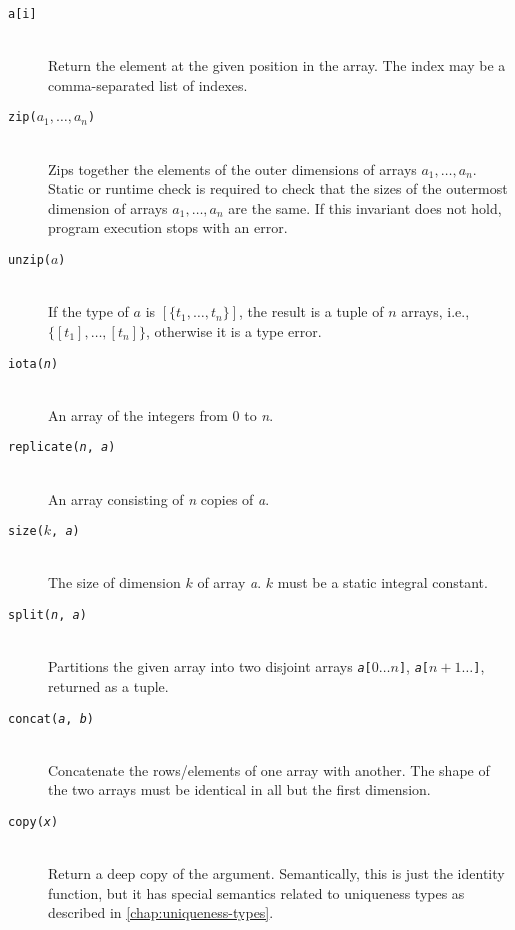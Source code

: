 \begin{description}
  \item[\texttt{a[i]}]\hfill\\
    Return the element at the given position in the array.  The index
    may be a comma-separated list of indexes.

  \item[\texttt{zip($a_1, \ldots, a_n$)}]\hfill\\
    Zips together the elements of the outer dimensions of arrays $a_1,
    \ldots, a_n$.  Static or runtime check is required to check that
    the sizes of the outermost dimension of arrays $a_1, \ldots, a_n$
    are the same.  If this invariant does not hold, program execution
    stops with an error.

  \item[\texttt{unzip($a$)}]\hfill\\
    If the type of $a$ is $[\{t_1, \ldots, t_n\}]$, the result is a
    tuple of $n$ arrays, i.e., $\{[t_1], \ldots, [t_n]\}$, otherwise
    it is a type error.

  \item[\texttt{iota(\textit{n})}]\hfill\\
    An array of the integers from $0$ to \textit{n}.

  \item[\texttt{replicate(\textit{n}, \textit{a})}]\hfill\\
    An array consisting of \textit{n} copies of \textit{a}.

  \item[\texttt{size($k$, \textit{a})}]\hfill\\
    The size of dimension $k$ of array \textit{a}.  $k$ must be a
    static integral constant.

  \item[\texttt{split(\textit{n}, \textit{a})}]\hfill\\
    Partitions the given array into two disjoint arrays
    \texttt{\textit{a}[$0\ldots{}n$]},
    \texttt{\textit{a}[$n+1\ldots{}$]}, returned as a tuple.

  \item[\texttt{concat(\textit{a}, \textit{b})}]\hfill\\
    Concatenate the rows/elements of one array with another.  The
    shape of the two arrays must be identical in all but the first
    dimension.

  \item[\texttt{copy(\textit{x})}]\hfill\\
    Return a deep copy of the argument.  Semantically, this is just
    the identity function, but it has special semantics related to
    uniqueness types as described in \cref{chap:uniqueness-types}.


\end{description}
